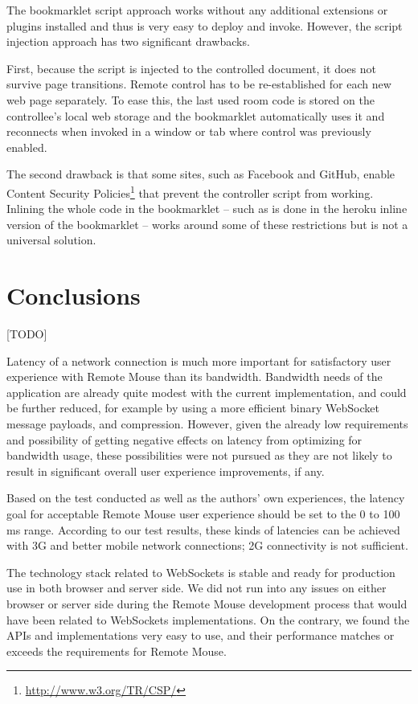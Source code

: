 \documentclass[a4paper,english,twocolumn]{article}
\begin{document}
The bookmarklet script approach works without any additional
extensions or plugins installed and thus is very easy to deploy and
invoke. However, the script injection approach has two significant
drawbacks.

First, because the script is injected to the controlled document, it
does not survive page transitions. Remote control has to be
re-established for each new web page separately. To ease this, the
last used room code is stored on the controllee's local web storage
and the bookmarklet automatically uses it and reconnects when invoked
in a window or tab where control was previously enabled.

The second drawback is that some sites, such as Facebook and GitHub,
enable Content Security
Policies\footnote{\url{http://www.w3.org/TR/CSP/}} that prevent the
controller script from working. Inlining the whole code in the
bookmarklet -- such as is done in the heroku inline version of the
bookmarklet -- works around some of these restrictions but is not a
universal solution.

\section{Conclusions}

[TODO]

Latency of a network connection is much more important for
satisfactory user experience with Remote Mouse than its
bandwidth. Bandwidth needs of the application are already quite modest
with the current implementation, and could be further reduced, for
example by using a more efficient binary WebSocket message payloads,
and compression. However, given the already low requirements and
possibility of getting negative effects on latency from optimizing for
bandwidth usage, these possibilities were not pursued as they are not
likely to result in significant overall user experience improvements,
if any.

Based on the test conducted as well as the authors' own experiences,
the latency goal for acceptable Remote Mouse user experience should be
set to the 0 to 100 ms range. According to our test results, these
kinds of latencies can be achieved with 3G and better mobile network
connections; 2G connectivity is not sufficient.

The technology stack related to WebSockets is stable and ready for
production use in both browser and server side. We did not run into
any issues on either browser or server side during the Remote Mouse
development process that would have been related to WebSockets
implementations. On the contrary, we found the APIs and
implementations very easy to use, and their performance matches or
exceeds the requirements for Remote Mouse.
\end{document}
